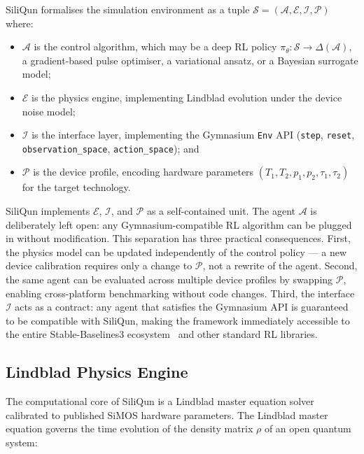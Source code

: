 SiliQun formalises the simulation environment as a tuple $\mathcal{S} = (\mathcal{A}, \mathcal{E}, \mathcal{I}, \mathcal{P})$ where:

\begin{itemize}
  \item $\mathcal{A}$ is the control algorithm, which may be a deep RL policy $\pi_\theta: \mathcal{S} \rightarrow \Delta(\mathcal{A})$, a gradient-based pulse optimiser, a variational ansatz, or a Bayesian surrogate model;
  \item $\mathcal{E}$ is the physics engine, implementing Lindblad evolution under the device noise model;
  \item $\mathcal{I}$ is the interface layer, implementing the Gymnasium \texttt{Env} API (\texttt{step}, \texttt{reset}, \texttt{observation\_space}, \texttt{action\_space}); and
  \item $\mathcal{P}$ is the device profile, encoding hardware parameters $(T_1, T_2, p_1, p_2, \tau_1, \tau_2)$ for the target technology.
\end{itemize}

SiliQun implements $\mathcal{E}$, $\mathcal{I}$, and $\mathcal{P}$ as a self-contained unit. The agent $\mathcal{A}$ is deliberately left open: any Gymnasium-compatible RL algorithm can be plugged in without modification. This separation has three practical consequences. First, the physics model can be updated independently of the control policy — a new device calibration requires only a change to $\mathcal{P}$, not a rewrite of the agent. Second, the same agent can be evaluated across multiple device profiles by swapping $\mathcal{P}$, enabling cross-platform benchmarking without code changes. Third, the interface $\mathcal{I}$ acts as a contract: any agent that satisfies the Gymnasium API is guaranteed to be compatible with SiliQun, making the framework immediately accessible to the entire Stable-Baselines3 ecosystem~\cite{Raffin2021} and other standard RL libraries.

\subsection{Lindblad Physics Engine}
\label{subsec:lindblad}

The computational core of SiliQun is a Lindblad master equation solver calibrated to published SiMOS hardware parameters. The Lindblad master equation governs the time evolution of the density matrix $\rho$ of an open quantum system:


